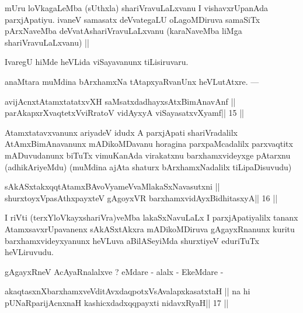 \begin{artha}
mUru loVkagaLeMba (sUthxla) shariVravuLaLxvanu I vishavxrUpanAda 
parxjApatiyu. ivaneV samasatx deVvategaLU oLagoMDiruva samaSiTx pArxNaveMba deVvatAshariVravuLaLxvanu (karaNaveMba liMga shariVravuLaLxvanu) ||
\end{artha} 
 
\begin{artha}
IvaregU hiMde heVLida viSayavanunx tiLisiruvaru.
\end{artha} 
 
 
\begin{artha}
anaMtara muMdina bArxhamxNa tAtapxyaRvanUnx heVLutAtxre. ---
\end{artha}

\begin{shl}
avijAcnxtAtamxtatatxvXH saMsatxdadhayxsAtxBimAnavAnf ||
parAkapxrXvaqtetxVviRratoV vidAyxyA viSayasatxvXyamf\hfill || 15 ||
\end{shl}

\begin{artha}
Atamxtatavxvanunx ariyadeV idudx A parxjApati shariVradalilx 
AtAmxBimAnavanunx mADikoMDavanu horagina parxpaMcadalilx parxvaqtitx mADuvudanunx biTuTx vimuKanAda virakatxnu barxhamxvideyxge pAtarxnu (adhikAriyeMdu) (muMdina ajAta shaturx bArxhamxNadalilx tiLipaDisuvudu)
\end{artha}

\begin{shl}
sAkASxtakxqqtAtamxBAvoV\s yameVvaMlakaSxNavasutxni ||
shurxtoyxVpasAthxpayxteV gAgoyxVR barxhamxvidAyxBidhitasxyA\hfill || 16 ||
\end{shl}

\begin{artha}
I riVti (terxYloVkayxshariVra)veMba lakaSxNavuLaLx I parxjApatiyalilx 
tananx AtamxsavxrUpavanenx sAkASxtAkxra mADikoMDiruva gAgayxRnanunx kuritu barxhamxvideyxyanunx heVLuva aBilASeyiMda shurxtiyeV eduriTuTx heVLiruvudu.
\end{artha} 
 
\begin{artha}
gAgayxRneV AcAyaRnalalxve ? eMdare - alalx - EkeMdare -
\end{artha}

\begin{shl}
akaqtasxnXbarxhamxveVditAvxdaqpotxV\s sAvalapxkasatxtaH ||
na hi pUNaRparijAcnxnaH kashicxdadxqqpayxti nidavxRyaH\hfill || 17 ||
\end{shl}

